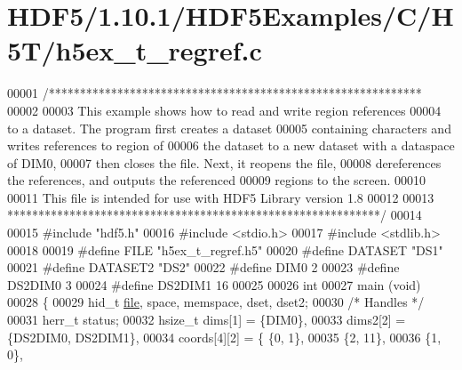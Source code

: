 \hypertarget{_h_d_f5_21_810_81_2_h_d_f5_examples_2_c_2_h5_t_2h5ex__t__regref_8c_source}{}\section{H\+D\+F5/1.10.1/\+H\+D\+F5\+Examples/\+C/\+H5\+T/h5ex\+\_\+t\+\_\+regref.c}
\label{_h_d_f5_21_810_81_2_h_d_f5_examples_2_c_2_h5_t_2h5ex__t__regref_8c_source}

\begin{DoxyCode}
00001 \textcolor{comment}{/************************************************************}
00002 \textcolor{comment}{}
00003 \textcolor{comment}{  This example shows how to read and write region references}
00004 \textcolor{comment}{  to a dataset.  The program first creates a dataset}
00005 \textcolor{comment}{  containing characters and writes references to region of}
00006 \textcolor{comment}{  the dataset to a new dataset with a dataspace of DIM0,}
00007 \textcolor{comment}{  then closes the file.  Next, it reopens the file,}
00008 \textcolor{comment}{  dereferences the references, and outputs the referenced}
00009 \textcolor{comment}{  regions to the screen.}
00010 \textcolor{comment}{}
00011 \textcolor{comment}{  This file is intended for use with HDF5 Library version 1.8}
00012 \textcolor{comment}{}
00013 \textcolor{comment}{ ************************************************************/}
00014 
00015 \textcolor{preprocessor}{#include "hdf5.h"}
00016 \textcolor{preprocessor}{#include <stdio.h>}
00017 \textcolor{preprocessor}{#include <stdlib.h>}
00018 
00019 \textcolor{preprocessor}{#define FILE            "h5ex\_t\_regref.h5"}
00020 \textcolor{preprocessor}{#define DATASET         "DS1"}
00021 \textcolor{preprocessor}{#define DATASET2        "DS2"}
00022 \textcolor{preprocessor}{#define DIM0            2}
00023 \textcolor{preprocessor}{#define DS2DIM0         3}
00024 \textcolor{preprocessor}{#define DS2DIM1         16}
00025 
00026 \textcolor{keywordtype}{int}
00027 main (\textcolor{keywordtype}{void})
00028 \{
00029     hid\_t               \hyperlink{structfile}{file}, space, memspace, dset, dset2;
00030                                                     \textcolor{comment}{/* Handles */}
00031     herr\_t              status;
00032     hsize\_t             dims[1] = \{DIM0\},
00033                         dims2[2] = \{DS2DIM0, DS2DIM1\},
00034                         coords[4][2] = \{ \{0,  1\},
00035                                          \{2, 11\},
00036                                          \{1,  0\},

\end{DoxyCode}
